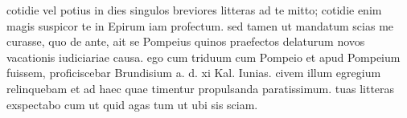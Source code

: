 


cotidie vel potius in dies singulos breviores litteras ad te mitto; cotidie
            enim magis suspicor te in Epirum iam profectum. sed tamen ut
            mandatum scias me curasse, quo de ante, ait se Pompeius quinos praefectos
            delaturum novos vacationis iudiciariae causa. ego cum triduum cum
              Pompeio et apud Pompeium fuissem, proficiscebar
              Brundisium a. d. xi Kal. Iunias. civem illum egregium relinquebam et ad haec quae timentur propulsanda
            paratissimum. tuas litteras exspectabo cum ut quid agas tum ut ubi sis sciam.
